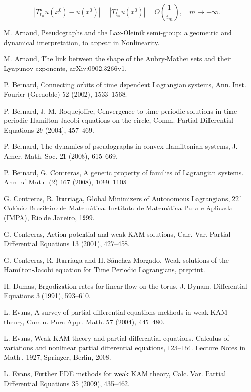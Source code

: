 \documentclass{amsart}[12pt]
\theoremstyle{definition}
\theoremstyle{remark}
\numberwithin{equation}{section}
\begin{document}
\[
|T^a_{t_m}u(x^0)-\bar{u}(x^0)|=|T^a_{t_m}u(x^0)|=O(\frac{1}{t_m}),
\quad m\to+\infty.
\]

\begin{thebibliography}{00}

M. Arnaud, Pseudographs and the Lax-Oleinik semi-group: a
geometric and dynamical interpretation, to appear in Nonlinearity.

M. Arnaud, The link between the shape of the Aubry-Mather sets and
their Lyapunov exponents, arXiv:0902.3266v1.

P. Bernard,  Connecting orbits of time dependent Lagrangian
systems, Ann. Inst. Fourier (Grenoble) 52 (2002), 1533--1568.

P. Bernard, J.-M. Roquejoffre,  Convergence to time-periodic
solutions in time-periodic Hamilton-Jacobi equations on the
circle, Comm. Partial Differential Equations 29 (2004), 457--469.

P. Bernard, The dynamics of pseudographs in convex Hamiltonian
systems, J. Amer. Math. Soc. 21 (2008), 615--669.

P. Bernard, G. Contreras, A generic property of families of
Lagrangian systems. Ann. of Math. (2) 167 (2008), 1099--1108.

G. Contreras, R. Iturriaga, Global Minimizers of Autonomous
Lagrangians, $22^\circ$ Col\'ouio Brasileiro de Matem\'atica.
Instituto de Matem\'atica Pura e Aplicada (IMPA), Rio de Janeiro,
1999.

G. Contreras, Action potential and weak KAM solutions, Calc. Var.
Partial Differential Equations 13 (2001), 427--458.

G. Contreras,  R. Iturriaga and H. S\'anchez Morgado, Weak
solutions of the Hamilton-Jacobi equation for Time Periodic
Lagrangians, preprint.

H. Dumas,  Ergodization rates for linear flow on the torus, J.
Dynam. Differential Equations 3 (1991), 593--610.

L. Evans, A survey of partial differential equations methods in
weak KAM theory, Comm. Pure Appl. Math. 57 (2004), 445--480.

L. Evans, Weak KAM theory and partial differential equations.
Calculus of variations and nonlinear partial differential
equations, 123--154. Lecture Notes in Math., 1927, Springer,
Berlin, 2008.

L. Evans, Further PDE methods for weak KAM theory, Calc. Var.
Partial Differential Equations 35 (2009),  435--462.


\end{thebibliography}
\end{document}
